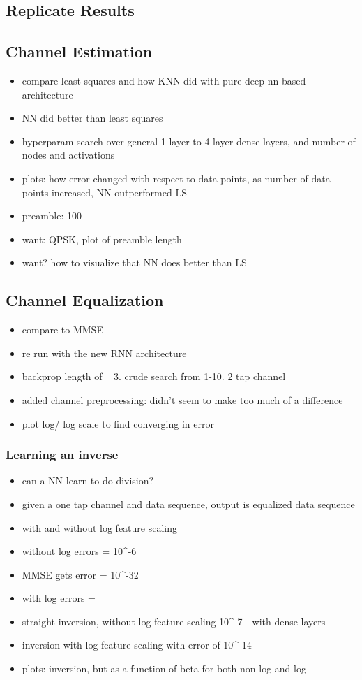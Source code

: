 \subsection{Replicate Results}

\subsection{Channel Estimation}

\begin{itemize}
\item compare least squares and how KNN did with pure deep nn based architecture
\item NN did better than least squares
\item hyperparam search over general 1-layer to 4-layer dense layers, and number of nodes and activations
\item plots: how error changed with respect to data points, as number of data points increased, NN outperformed LS
\item preamble: 100
\item want: QPSK, plot of preamble length
\item want? how to visualize that NN does better than LS
\end{itemize}

\subsection{Channel Equalization}

\begin{itemize}
\item compare to MMSE
\item re run with the new RNN architecture
\item backprop length of ~ 3. crude search from 1-10. 2 tap channel
\item added channel preprocessing: didn't seem to make too much of a difference
\item plot log/ log scale to find converging in error
\end{itemize}

\subsubsection{Learning an inverse}
\begin{itemize}
\item can a NN learn to do division?
\item given a one tap channel and data sequence, output is equalized data sequence
\item with and without log feature scaling
\item without log errors = 10^-6
\item MMSE gets error = 10^-32
\item with log errors = 
\item straight inversion, without log feature scaling 10^-7 - with dense layers
\item inversion with log feature scaling with error of 10^-14 
\item plots: inversion, but as a function of beta for both non-log and log
\end{itemize}

